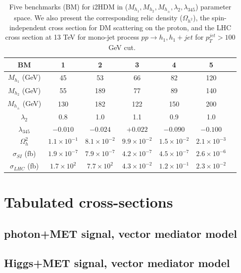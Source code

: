 \begin{table}[htb]
\centering
\begin{tabular}{|c||c|c|c|c|c|c|}
\hline
 {\bf BM}                       &  {\bf 1}  & {\bf 2}  & {\bf 3}  & {\bf 4}  &  {\bf 5}  \\
  \hline\hline 
  $M_{h_{1}}$ (GeV)     & 45 & 53 & 66 & 82 & 120 \\ 
  \hline
  $M_{h_{2}}$ (GeV)     &  55  & 189  &  77  &  89  & 140 \\
  \hline
  $M_{h_{\pm}}$ (GeV)  & 130 & 182  &  122  &  150  &  200 \\
  \hline
  $\lambda_{2}$             &  0.8 & 1.0 & 1.1 & 0.9 & 1.0 \\  
  \hline
  $\lambda_{345}$         & $-0.010$ & $-0.024$  & $+0.022$ & $-0.090$  & $-0.100$      \\
  \hline
  $\Omega^{2}_{h}$       & $1.1 \times 10^{-1}$ &  $8.1 \times 10^{-2}$  & $9.9 \times 10^{-2}$  & $1.5 \times 10^{-2}$  &  $2.1 \times 10^{-3}$ \\
  \hline 
  $\sigma_{SI}$ (fb)        & $1.9 \times 10^{-7}$ &  $7.9 \times 10^{-7}$  & $4.2 \times 10^{-7}$  & $4.5 \times 10^{-7}$  &  $2.6 \times 10^{-6}$ \\
 \hline 
  $\sigma_{LHC}$ (fb)     & $1.7 \times 10^{2}$ &  $7.7 \times 10^{2}$  & $4.3 \times 10^{-2}$  & $1.2 \times 10^{-1}$  &  $2.3 \times 10^{-2}$ \\
  \hline\hline
\end{tabular}
\caption{Five benchmarks (BM) for i2HDM in  ($M_{h_{1}},M_{h_{2}},M_{h_{\pm}},\lambda_{2},\lambda_{345}$) parameter space.
 We also present the corresponding relic density ($\Omega_{h^2}$), the spin-independent cross section for DM scattering on the proton,
 and the LHC cross section at 13 TeV for mono-jet process $pp\to h_1,h_1+jet$ for $p_T^{jet}>100$~GeV cut.}
\label{tab:i2HDMbenchMarks}
\end{table}
\clearpage

\section{Tabulated cross-sections}

\subsection{photon+MET signal, \schannel vector mediator model}

\subsection{Higgs+MET signal, vector mediator model}

